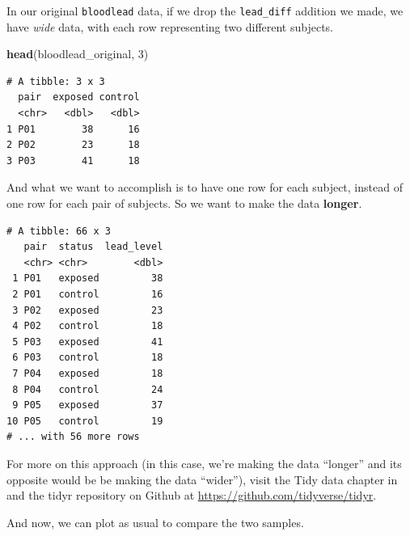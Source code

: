 \documentclass[
]{book}
\newenvironment{Shaded}{\begin{snugshade}}{\end{snugshade}}
\newcommand{\DataTypeTok}[1]{\textcolor[rgb]{0.13,0.29,0.53}{#1}}
\newcommand{\DecValTok}[1]{\textcolor[rgb]{0.00,0.00,0.81}{#1}}
\newcommand{\KeywordTok}[1]{\textcolor[rgb]{0.13,0.29,0.53}{\textbf{#1}}}
\newcommand{\NormalTok}[1]{#1}
\newcommand{\OperatorTok}[1]{\textcolor[rgb]{0.81,0.36,0.00}{\textbf{#1}}}
\newcommand{\StringTok}[1]{\textcolor[rgb]{0.31,0.60,0.02}{#1}}
\begin{document}
In our original \texttt{bloodlead} data, if we drop the \texttt{lead\_diff} addition we made, we have \emph{wide} data, with each row representing two different subjects.

\begin{Shaded}
\begin{Highlighting}[]
\KeywordTok{head}\NormalTok{(bloodlead_original, }\DecValTok{3}\NormalTok{)}
\end{Highlighting}
\end{Shaded}

\begin{verbatim}
# A tibble: 3 x 3
  pair  exposed control
  <chr>   <dbl>   <dbl>
1 P01        38      16
2 P02        23      18
3 P03        41      18
\end{verbatim}

And what we want to accomplish is to have one row for each subject, instead of one row for each pair of subjects. So we want to make the data \textbf{longer}.

\begin{Shaded}
\end{Shaded}

\begin{verbatim}
# A tibble: 66 x 3
   pair  status  lead_level
   <chr> <chr>        <dbl>
 1 P01   exposed         38
 2 P01   control         16
 3 P02   exposed         23
 4 P02   control         18
 5 P03   exposed         41
 6 P03   control         18
 7 P04   exposed         18
 8 P04   control         24
 9 P05   exposed         37
10 P05   control         19
# ... with 56 more rows
\end{verbatim}

For more on this approach (in this case, we're making the data ``longer'' and its opposite would be be making the data ``wider''), visit the Tidy data chapter in \citet{R4DS} and the tidyr repository on Github at \url{https://github.com/tidyverse/tidyr}.

And now, we can plot as usual to compare the two samples.
\end{document}
